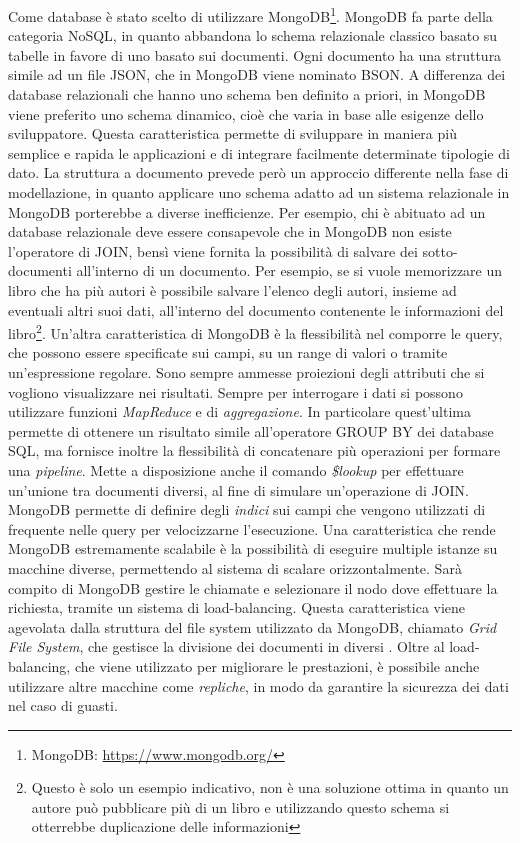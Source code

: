 Come database è stato scelto di utilizzare MongoDB\footnote{MongoDB: \url{https://www.mongodb.org/}}. MongoDB fa parte della categoria NoSQL, in quanto abbandona lo schema relazionale classico basato su tabelle in favore di uno basato sui documenti. Ogni documento ha una struttura simile ad un file JSON, che in MongoDB viene nominato BSON. A differenza dei database relazionali che hanno uno schema ben definito a priori, in MongoDB viene preferito uno schema dinamico, cioè che varia in base alle esigenze dello sviluppatore. Questa caratteristica permette di sviluppare in maniera più semplice e rapida le applicazioni e di integrare facilmente determinate tipologie di dato. La struttura a documento prevede però un approccio differente nella fase di modellazione, in quanto applicare uno schema adatto ad un sistema relazionale in MongoDB porterebbe a diverse inefficienze. Per esempio, chi è abituato ad un database relazionale deve essere consapevole che in MongoDB non esiste l'operatore di JOIN, bensì viene fornita la possibilità di salvare dei sotto-documenti all'interno di un documento. Per esempio, se si vuole memorizzare un libro che ha più autori è possibile salvare l'elenco degli autori, insieme ad eventuali altri suoi dati, all'interno del documento contenente le informazioni del libro\footnote{Questo è solo un esempio indicativo, non è una soluzione ottima in quanto un autore può pubblicare più di un libro e utilizzando questo schema si otterrebbe duplicazione delle informazioni}. Un'altra caratteristica di MongoDB è la flessibilità nel comporre le query, che possono essere specificate sui campi, su un range di valori o tramite un'espressione regolare. Sono sempre ammesse proiezioni degli attributi che si vogliono visualizzare nei risultati. Sempre per interrogare i dati si possono utilizzare funzioni \emph{MapReduce} e di \emph{aggregazione}. In particolare quest'ultima permette di ottenere un risultato simile all'operatore GROUP BY dei database SQL, ma fornisce inoltre la flessibilità di concatenare più operazioni per formare una \emph{pipeline}. Mette a disposizione anche il comando \emph{\$lookup} per effettuare un'unione tra documenti diversi, al fine di simulare un'operazione di JOIN. MongoDB permette di definire degli \emph{indici} sui campi che vengono utilizzati di frequente nelle query per velocizzarne l'esecuzione. Una caratteristica che rende MongoDB estremamente scalabile è la possibilità di eseguire multiple istanze su macchine diverse, permettendo al sistema di scalare orizzontalmente. Sarà compito di MongoDB gestire le chiamate e selezionare il nodo dove effettuare la richiesta, tramite un sistema di load-balancing. Questa caratteristica viene agevolata dalla struttura del file system utilizzato da MongoDB, chiamato \emph{Grid File System}, che gestisce la divisione dei documenti in diversi . Oltre al load-balancing, che viene utilizzato per migliorare le prestazioni, è possibile anche utilizzare altre macchine come \emph{repliche}, in modo da garantire la sicurezza dei dati nel caso di guasti.

